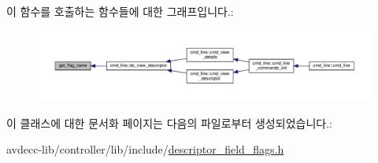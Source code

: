 이 함수를 호출하는 함수들에 대한 그래프입니다.\+:
\nopagebreak
\begin{figure}[H]
\begin{center}
\leavevmode
\includegraphics[width=350pt]{classavdecc__lib_1_1descriptor__field__flags_a9bdb121f8abed6c9bc95bc8a8d232129_icgraph}
\end{center}
\end{figure}




이 클래스에 대한 문서화 페이지는 다음의 파일로부터 생성되었습니다.\+:\begin{DoxyCompactItemize}
\item 
avdecc-\/lib/controller/lib/include/\hyperlink{descriptor__field__flags_8h}{descriptor\+\_\+field\+\_\+flags.\+h}\end{DoxyCompactItemize}
